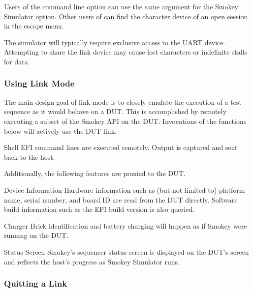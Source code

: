 Users of the  command line option  can use the
same argument for the Smokey Simulator  option.  Other users of
 can find the character device of an open session in the
escape menu.

The simulator will typically require exclusive access to the UART device.
Attempting to share the link device may cause lost characters or indefinite
stalls for data.

\subsubsection{Using Link Mode}

The main design goal of link mode is to closely emulate the execution of a test
sequence as it would behave on a DUT.  This is accomplished by remotely
executing a subset of the Smokey API on the DUT.  Invocations of the functions
below will actively use the DUT link.

\begin{Descriptive}

	\item[Shell] EFI command lines are executed remotely.  Output is
	captured and sent back to the host.

\end{Descriptive}

Additionally, the following features are proxied to the DUT.

\begin{Descriptive}

	\item[Device Information] Hardware information such as (but not limited
	to) platform name, serial number, and board ID are read from the DUT
	directly.  Software build information such as the EFI build version is
	also queried.

	\item[Charger] Brick identification and battery charging will happen as
	if Smokey were running on the DUT.

	\item[Status Screen] Smokey's sequencer status screen is displayed on
	the DUT's screen and reflects the host's progress as Smokey Simulator
	runs.

\end{Descriptive}

\subsubsection{Quitting a Link}

